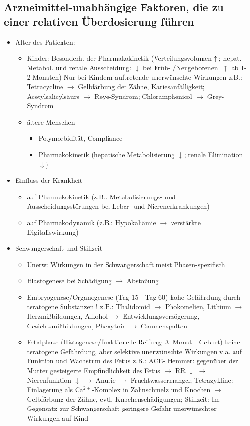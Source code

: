 \documentclass[10pt,a4paper]{report}
\begin{document}
\subsection{Arzneimittel-unabhängige Faktoren, die zu einer relativen Überdosierung führen}
\begin{itemize}
	\item Alter des Patienten: 
	\begin{itemize}
		\item Kinder: Besonderh. der Pharmakokinetik (Verteilungsvolumen$\uparrow$; hepat. Metabol. und renale Ausscheidung: $\downarrow$ bei Früh- /Neugeborenen; $\uparrow$ ab 1-2 Monaten) Nur bei Kindern auftretende unerwünschte Wirkungen	z.B.: Tetracycline $\rightarrow$ Gelbfärbung der Zähne, Kariesanfälligkeit;	Acetylsalicylsäure $\rightarrow$ Reye-Syndrom; Chloramphenicol $\rightarrow$ Grey-Syndrom
		\item ältere Menschen
		\begin{itemize}
			\item Polymorbidität, Compliance
			\item Pharmakokinetik (hepatische Metabolisierung $\downarrow$; renale Elimination $\downarrow$)
		\end{itemize}
	\end{itemize}	 
	\item Einfluss der Krankheit
	\begin{itemize}
		\item auf Pharmakokinetik (z.B.: Metabolisierungs- und Ausscheidungsstörungen 
		bei Leber- und Nierenerkrankungen)
		\item auf Pharmakodynamik (z.B.: Hypokaliämie $\rightarrow$ verstärkte Digitaliswirkung)
	\end{itemize}
	\item Schwangerschaft und Stillzeit
	\begin{itemize}
		\item Unerw: Wirkungen in der Schwangerschaft meist Phasen-spezifisch
		\item Blastogenese  bei Schädigung $\rightarrow$ Abstoßung
		\item Embryogenese/Organogenese (Tag 15 - Tag 60) hohe Gefährdung durch teratogene Substanzen ! z.B.: Thalidomid $\rightarrow$ Phokomelien, Lithium $\rightarrow$ Herzmißbildungen, Alkohol $\rightarrow$ Entwicklungsverzögerung, Gesichtsmißbildungen,	Phenytoin $\rightarrow$ Gaumenspalten
		\item Fetalphase (Histogenese/funktionelle Reifung; 3. Monat - Geburt) keine teratogene Gefährdung, aber selektive unerwünschte Wirkungen v.a. auf Funktion und Wachstum des Fetus z.B.: 	ACE- Hemmer: gegenüber der Mutter gesteigerte Empfindlichkeit des Fetus $\rightarrow$ RR $\downarrow$ $\rightarrow$ Nierenfunktion $\downarrow$ $\rightarrow$ Anurie $\rightarrow$ Fruchtwassermangel; Tetrazykline: Einlagerung als Ca$^{2+}$-Komplex in Zahnschmelz und Knochen $\rightarrow$ Gelbfärbung der Zähne, evtl. Knochenschädigungen; Stillzeit: Im Gegensatz zur Schwangerschaft geringere Gefahr unerwünschter Wirkungen auf Kind

\end{itemize}
\end{itemize}
\end{document}
